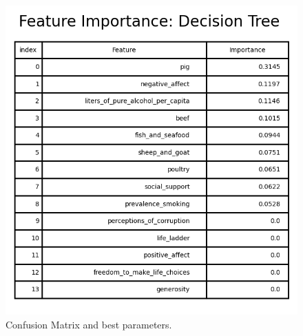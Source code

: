                 \begin{figure}[H]
                        \centering
                        \includegraphics[scale=1]{images/dm_featu_imp_deci_tree}
                        \caption{Confusion Matrix and best parameters.}
                        \label{fig:dm-decision-tree-bp}
                \end{figure}

